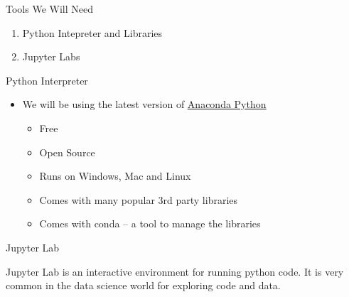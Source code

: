 %
%
%
\begin{Slide}{Tools We Will Need}
  \begin{enumerate}
   \item Python Intepreter and Libraries
   \item Jupyter Labs
  \end{enumerate}
\end{Slide} 

%
%
%
\begin{Slide}{Python Interpreter}

\begin{itemize}
\item We will be using the latest version of  \underline{\href{https://www.anaconda.com/products/distribution}{Anaconda Python}}
\begin{itemize}
\item Free
\item Open Source
\item Runs on Windows, Mac and Linux
\item Comes with many popular 3rd party libraries
\item Comes with conda -- a tool to manage the libraries
\end{itemize}
\end{itemize}

\end{Slide} 


%
%
%
\begin{Slide}{Jupyter Lab}

  Jupyter Lab is an interactive environment for running python code.  It is very common in the data science world for exploring code and data.
  
\end{Slide}

